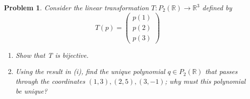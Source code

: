 \documentclass{article}
\newcommand{\R}{\mathbb{R}}
\newtheorem{problem}{Problem}
\begin{document}
\newpage
\begin{problem}
  Consider the linear transformation $T : P_2(\R) \to \R^3$ defined by
  $$ T(p) = \begin{pmatrix}
    p(1) \\ p(2) \\ p(3)
  \end{pmatrix} $$
  \begin{enumerate}
    \item Show that T is bijective.
    \item Using the result in (i), find the unique polynomial $q \in P_2(\R)$ that passes through the coordinates $(1, 3),(2, 5),(3, -1)$; why must this polynomial be unique?
  \end{enumerate}
\end{problem}
\end{document}
